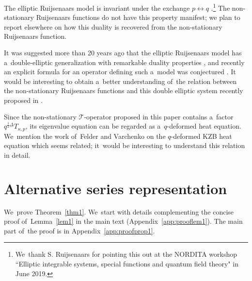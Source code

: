 \documentclass[pdftex]{sigma}%
\numberwithin{equation}{section}
\newcommand{\cT}{{\mathcal T}}
\begin{document}
The elliptic Ruijsenaars model is invariant under the exchange $p\leftrightarrow q$ \cite{R87}.\footnote{We~thank S. Ruijsenaars for pointing this out at the NORDITA workshop ``Elliptic integrable systems, special functions and quantum field theory" in June 2019.}
The non-sta\-tionary Ruijsenaars functions do not have this property manifest; we plan to report elsewhere on how this duality is recovered from the non-stationary Ruijsenaars function.

It was suggested more than 20 years ago that the elliptic Ruijsenaars model has a~double-elliptic generalization with remarkable duality properties \cite{BMMM,FGNR}, and recently an explicit formula for an operator defining such a~model was conjectured \cite{KS}.
It would be interesting to obtain a~better understanding of~the relation between the non-stationary Ruijsenaars functions and this double elliptic system recently proposed in \cite{AKMM}.

Since the non-stationary $\cT$-operator proposed in this paper contains a~factor $q^{\frac12\Delta}T_{\kappa,p}$, its eigenvalue equation can be regarded as a~$q$-deformed heat equation. We~mention the work of~Felder and Varchenko on the $q$-deformed KZB heat equation \cite{FV2,FV3} which seems related; it~would be interesting to understand this relation in detail.

\appendix

\section{Alternative series representation}
\label{app:proof}
We~prove Theorem~\ref{thm1}.
We~start with details complementing the concise proof of~Lemma~\ref{lem1} in the main text (Appen\-dix~\ref{app:prooflem1}). The main part of~the proof is in Appendix~\ref{app:proofprop1}.
\end{document}
